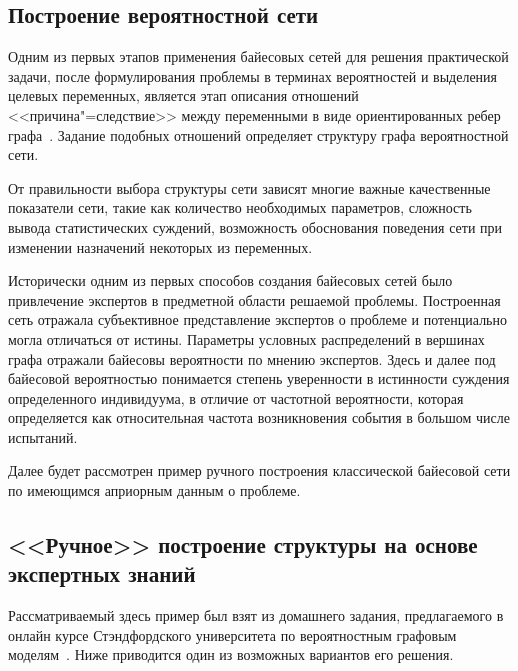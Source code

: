 
\subsection{Построение вероятностной сети}
\label{sub:domain:learning_structure}
Одним из первых этапов применения байесовых сетей для решения практической задачи, после формулирования проблемы в терминах вероятностей и выделения целевых переменных, является этап описания отношений <<причина"=следствие>> между переменными в виде ориентированных ребер графа~\cite{terehov_2003}.
Задание подобных отношений определяет структуру графа вероятностной сети.

От правильности выбора структуры сети зависят многие важные качественные показатели сети, такие как количество необходимых параметров, сложность вывода статистических суждений, возможность обоснования поведения сети при изменении назначений некоторых из переменных.

Исторически одним из первых способов создания байесовых сетей было привлечение экспертов в предметной области решаемой проблемы.
Построенная сеть отражала субъективное представление экспертов о проблеме и потенциально могла отличаться от истины.
Параметры условных распределений в вершинах графа отражали байесовы вероятности по мнению экспертов.
Здесь и далее под байесовой вероятностью понимается степень уверенности в истинности суждения определенного индивидуума, в отличие от частотной вероятности, которая определяется как относительная частота возникновения события в большом числе испытаний.

Далее будет рассмотрен пример ручного построения классической байесовой сети по имеющимся априорным данным о проблеме.


\subsection{<<Ручное>> построение структуры на основе экспертных знаний}
\label{sub:domain:manual_structure}
Рассматриваемый здесь пример был взят из домашнего задания, предлагаемого в онлайн курсе Стэндфордского университета по вероятностным графовым моделям~\cite{pgm_course}.
Ниже приводится один из возможных вариантов его решения.

